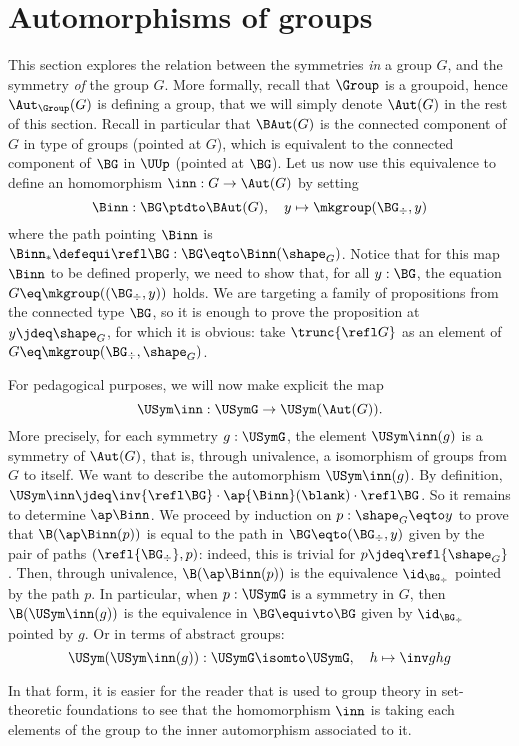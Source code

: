 \section{Automorphisms of groups}
\label{sec:aut-goup}%
%

This section explores the relation between the symmetries {\em in} a group $G$,
and the symmetry {\em of} the group $G$. More formally, recall that $\Group$ is
a groupoid, hence $\Aut_\Group(G)$ is defining a group, that we will simply
denote $\Aut(G)$ in the rest of this section. Recall in particular that
$\BAut(G)$ is the connected component of $G$ in type of groups (pointed at $G$),
which is equivalent to the connected component of $\BG$ in $\UUp$ (pointed at
$\BG$). Let us now use this equivalence to define an homomorphism
$\inn: G \to \Aut(G)$ by setting
\begin{displaymath}
  \Binn : \BG \ptdto \BAut(G), \quad y \mapsto \mkgroup(\BG_\div , y)
\end{displaymath}
where the path pointing $\Binn$ is
$\Binn_\ast \defequi \refl \BG : \BG \eqto \Binn (\shape_G)$. Notice that for
this map $\Binn$ to be defined properly, we need to show that, for all $y:\BG$,
the equation $G \eq \mkgroup((\BG_\div , y))$ holds. We are targeting a family of propositions
from the connected type $\BG$, so it is enough to prove the proposition at
$y\jdeq \shape_G$, for which it is obvious: take $\trunc{\refl G}$ as an
element of $G \eq \mkgroup(\BG_\div , \shape_G)$.

\begin{remark}
  For pedagogical purposes, we will now make explicit the map
  \begin{displaymath}
    \USym\inn: \USymG \to \USym(\Aut(G)).
  \end{displaymath}
  More precisely, for each symmetry $g:\USymG$, the element $\USym\inn(g)$ is a
  symmetry of $\Aut(G)$, that is, through univalence, a isomorphism of groups
  from $G$ to itself. We want to describe the automorphism $\USym\inn(g)$. By
  definition,
  $\USym\inn \jdeq \inv{\refl\BG} \cdot \ap {\Binn} (\blank) \cdot \refl\BG$. So it
  remains to determine $\ap \Binn$. We proceed by induction on
  $p:\shape_G \eqto y$ to prove that $\B(\ap\Binn(p))$ is equal to the path in
  $\BG \eqto (\BG_\div, y)$ given by the pair of paths $(\refl{\BG_\div}, p)$:
  indeed, this is trivial for $p\jdeq \refl{\shape_G}$. Then, through
  univalence, $\B(\ap\Binn(p))$ is the equivalence $\id_{\BG_\div}$ pointed by
  the path $p$. In particular, when $p:\USymG$ is a symmetry in $G$, then
  $\B(\USym\inn(g))$ is the equivalence in $\BG \equivto \BG$ given by
  $\id_{\BG_\div}$ pointed by $g$. Or in terms of abstract groups:
  \begin{displaymath}
    \USym(\USym\inn(g)) : \USymG \isomto \USymG, \quad h \mapsto \inv g h g
  \end{displaymath}

  In that form, it is easier for the reader that is used to group theory in
  set-theoretic foundations to see that the homomorphism $\inn$ is taking each
  elements of the group to the inner automorphism associated to it.
\end{remark}


